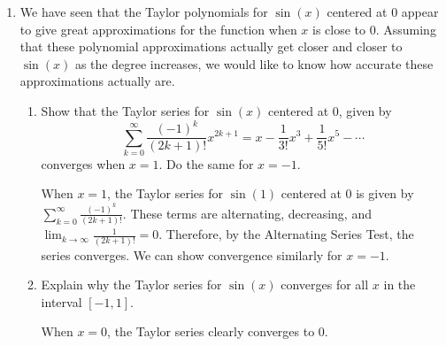 \documentclass[main]{subfiles}
\begin{document}
\begin{enumerate}



\item \label{sine1}

We have seen that the Taylor polynomials for $\sin(x)$ centered at 0 appear to give great approximations for the function when $x$ is close to 0. Assuming that these polynomial approximations actually get closer and closer to $\sin(x)$ as the degree increases, we would like to know how accurate these approximations actually are.

\begin{enumerate}

\item
\begin{problem}[\vfill] Show that the Taylor series for $\sin(x)$ centered at 0, given by $$\displaystyle \sum_{k=0}^{\infty} \frac{(-1)^k}{(2k+1)!}x^{2k+1}=x-\frac{1}{3!}x^3+\frac{1}{5!}x^5-\cdots$$ converges when $x=1$.   Do the same for $x=-1$.
\end{problem}

\begin{solution}
When $x=1$, the Taylor series for $\sin(1)$ centered at 0 is given by $\displaystyle \sum_{k=0}^{\infty} \frac{(-1)^k}{(2k+1)!}$. These terms are alternating, decreasing, and $\displaystyle\lim_{k\to\infty} \frac{1}{(2k+1)!}=0$. Therefore, by the Alternating Series Test, the series converges. We can show convergence similarly for $x=-1$.
\end{solution}

\item 
\begin{problem}[\vfill]
    Explain why the Taylor series for $\sin(x)$ converges for all $x$ in the interval $[-1,1]$.
\end{problem}

\begin{solution}
When $x=0$, the Taylor series clearly converges to 0. 


\end{solution}
\end{enumerate}
\end{enumerate}
\end{document}
